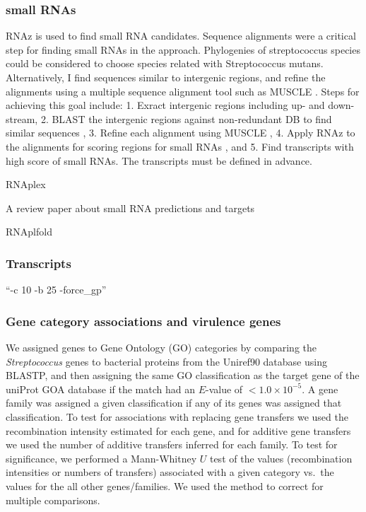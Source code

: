 \documentclass{article}
\begin{document}
\subsubsection{small RNAs}

RNAz is used to find small RNA candidates. Sequence alignments were a
critical step for finding small RNAs in the approach. Phylogenies of streptococcus species could
be considered to choose species related with Streptococcus mutans.
Alternatively, I find sequences similar to intergenic regions, and refine the
alignments using a multiple sequence alignment tool such as MUSCLE
\cite{Edgar2004a}. Steps for
achieving this goal include: 1. Exract intergenic regions including up- and
down-stream, 2. BLAST the intergenic regions against non-redundant DB to find
similar sequences \cite{Altschul1990}, 3. Refine each alignment using MUSCLE \cite{Edgar2004a}, 4. Apply RNAz to the
alignments for scoring regions for small RNAs
\cite{Washietl2005,Gruber2010}, and 5. Find transcripts with high
score of small RNAs. The transcripts must be defined in advance.

RNAplex
\cite{Tafer2008}

A review paper about small RNA predictions and targets
\cite{Tafer2008a}

RNAplfold
\cite{Bernhart2006}

\subsubsection{Transcripts}

``-c 10 -b 25 -force\_gp''

\subsubsection{Gene category associations and virulence genes}

We assigned genes to Gene Ontology (GO) categories by comparing the {\em
  Streptococcus} genes to bacterial proteins from the Uniref90 database
using BLASTP, and then assigning the same GO classification as the target
gene of the uniProt GOA database if the match had an $E$-value of
$<1.0\times10^{-5}.$  
A gene family was assigned a given
classification if any of its genes was assigned that classification.  To
test for associations with replacing gene transfers we used the
recombination intensity estimated for each gene, and for additive gene
transfers we used the number of additive transfers inferred for each
family.  To test for significance, we performed a Mann-Whitney $U$ test of
the values (recombination intensities or numbers of transfers) associated
with a given category vs.\ the values for the all other genes/families.  We
used the \cite{Benjamini1995} method to correct for multiple comparisons.
\end{document}
